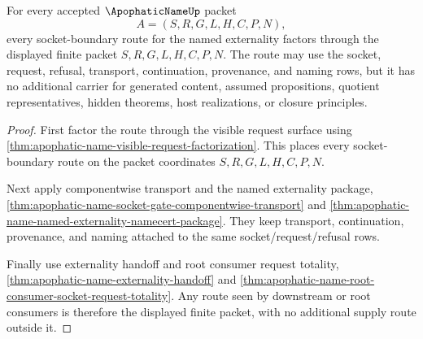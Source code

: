 \begin{theorem}
\label{thm:apophatic-name-socket-boundary-route-exhaustion}
For every accepted $\ApophaticNameUp$ packet
$$
A=(S,R,G,L,H,C,P,N),
$$
every socket-boundary route for the named externality factors through the displayed finite packet $S,R,G,L,H,C,P,N$. The route may use the socket, request, refusal, transport, continuation, provenance, and naming rows, but it has no additional carrier for generated content, assumed propositions, quotient representatives, hidden theorems, host realizations, or closure principles.
\end{theorem}
\begin{proof}
First factor the route through the visible request surface using \autoref{thm:apophatic-name-visible-request-factorization}. This places every socket-boundary route on the packet coordinates $S,R,G,L,H,C,P,N$.

Next apply componentwise transport and the named externality package, \autoref{thm:apophatic-name-socket-gate-componentwise-transport} and \autoref{thm:apophatic-name-named-externality-namecert-package}. They keep transport, continuation, provenance, and naming attached to the same socket/request/refusal rows.

Finally use externality handoff and root consumer request totality, \autoref{thm:apophatic-name-externality-handoff} and \autoref{thm:apophatic-name-root-consumer-socket-request-totality}. Any route seen by downstream or root consumers is therefore the displayed finite packet, with no additional supply route outside it.
\end{proof}

